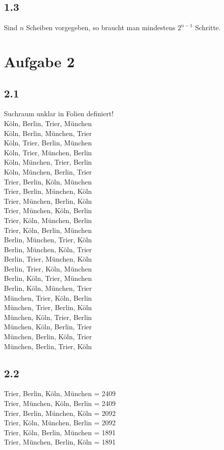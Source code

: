\documentclass[10pt, a4paper]{article}
\begin{document}
\subsection*{1.3}
Sind $n$ Scheiben vorgegeben, so braucht man mindestens $2^{n-1}$ Schritte.

\section*{Aufgabe 2}
\subsection*{2.1}
Suchraum unklar in Folien definiert!\medskip\\
Köln, Berlin, Trier, München\\
Köln, Berlin, München, Trier\\
Köln, Trier, Berlin, München\\
Köln, Trier, München, Berlin\\
Köln, München, Trier, Berlin\\
Köln, München, Berlin, Trier\\
Trier, Berlin, Köln, München\\
Trier, Berlin, München, Köln\\
Trier, München, Berlin, Köln\\
Trier, München, Köln, Berlin\\
Trier, Köln, München, Berlin\\
Trier, Köln, Berlin, München\\
Berlin, München, Trier, Köln\\
Berlin, München, Köln, Trier\\
Berlin, Trier, München, Köln\\
Berlin, Trier, Köln, München\\
Berlin, Köln, Trier, München\\
Berlin, Köln, München, Trier\\
München, Trier, Köln, Berlin\\
München, Trier, Berlin, Köln\\
München, Köln, Trier, Berlin\\
München, Köln, Berlin, Trier\\
München, Berlin, Köln, Trier\\
München, Berlin, Trier, Köln\\

\subsection*{2.2}
Trier, Berlin, Köln, München = 2409\\
Trier, München, Köln, Berlin = 2409\\
Trier, Berlin, München, Köln = 2092\\
Trier, Köln, München, Berlin = 2092\\
Trier, Köln, Berlin, München = 1891\\
Trier, München, Berlin, Köln = 1891\\
\end{document}
